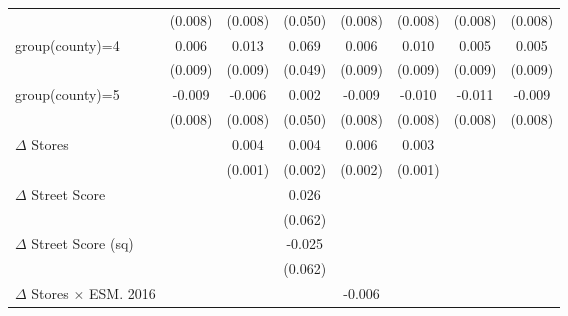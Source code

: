 {\begin{tabular}{l*{7}{c}}
                    &     (0.008)         &     (0.008)         &     (0.050)         &     (0.008)         &     (0.008)         &     (0.008)         &     (0.008)         \\
group(county)=4     &       0.006         &       0.013         &       0.069         &       0.006         &       0.010         &       0.005         &       0.005         \\
                    &     (0.009)         &     (0.009)         &     (0.049)         &     (0.009)         &     (0.009)         &     (0.009)         &     (0.009)         \\
group(county)=5     &      -0.009         &      -0.006         &       0.002         &      -0.009         &      -0.010         &      -0.011         &      -0.009         \\
                    &     (0.008)         &     (0.008)         &     (0.050)         &     (0.008)         &     (0.008)         &     (0.008)         &     (0.008)         \\
$\Delta$ Stores     &                     &       0.004\sym{**} &       0.004\sym{**} &       0.006\sym{***}&       0.003\sym{**} &                     &                     \\
                    &                     &     (0.001)         &     (0.002)         &     (0.002)         &     (0.001)         &                     &                     \\
$\Delta$ Street Score&                     &                     &       0.026         &                     &                     &                     &                     \\
                    &                     &                     &     (0.062)         &                     &                     &                     &                     \\
$\Delta$ Street Score (sq)&                     &                     &      -0.025         &                     &                     &                     &                     \\
                    &                     &                     &     (0.062)         &                     &                     &                     &                     \\
$\Delta$ Stores $\times$ ESM. 2016&                     &                     &                     &      -0.006\sym{**} &                     &                     &                     \\

\end{tabular}}
